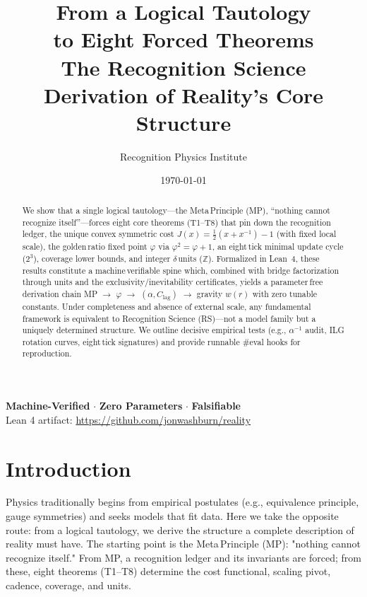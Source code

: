 \documentclass[11pt]{article}
\title{%
  \vspace{-1em}
  {\Huge\bfseries\color{rsblue} From a Logical Tautology\\[0.3em] to Eight Forced Theorems}\\[1em]
  {\Large\color{black!70} The Recognition Science Derivation of Reality's Core Structure}
  \vspace{0.5em}
}
\author{{\large Recognition Physics Institute}}
\date{\today}
\begin{document}
\maketitle
\thispagestyle{empty}

\vspace{-1em}
\begin{center}
\colorbox{rsgold!20}{\parbox{0.9\textwidth}{
\centering
\textbf{Machine-Verified} $\cdot$ \textbf{Zero Parameters} $\cdot$ \textbf{Falsifiable}\\[0.3em]
\small Lean 4 artifact: \url{https://github.com/jonwashburn/reality}
}}
\end{center}

\vspace{1em}

\begin{abstract}
We show that a single logical tautology—the Meta\,Principle (MP), “nothing cannot recognize itself”—forces eight core theorems (T1–T8) that pin down the recognition ledger, the unique convex symmetric cost $J(x)=\tfrac12(x+x^{-1})-1$ (with fixed local scale), the golden\,ratio fixed point $\varphi$ via $\varphi^2=\varphi+1$, an eight\,tick minimal update cycle ($2^3$), coverage lower bounds, and integer $\delta$\,units ($\mathbb Z$). Formalized in Lean~4, these results constitute a machine\,verifiable spine which, combined with bridge factorization through units and the exclusivity/inevitability certificates, yields a parameter\,free derivation chain MP $\to$ $\varphi$ $\to$ $(\alpha, C_{\!\mathrm{lag}})$ $\to$ gravity $w(r)$ with zero tunable constants. Under completeness and absence of external scale, any fundamental framework is equivalent to Recognition Science (RS)—not a model family but a uniquely determined structure. We outline decisive empirical tests (e.g., $\alpha^{-1}$ audit, ILG rotation curves, eight\,tick signatures) and provide runnable \#eval hooks for reproduction.
\end{abstract}

\section*{Introduction}
Physics traditionally begins from empirical postulates (e.g., equivalence principle, gauge symmetries) and seeks models that fit data. Here we take the opposite route: from a logical tautology, we derive the structure a complete description of reality must have. The starting point is the Meta\,Principle (MP): "nothing cannot recognize itself." From MP, a recognition ledger and its invariants are forced; from these, eight theorems (T1–T8) determine the cost functional, scaling pivot, cadence, coverage, and units.
\end{document}
